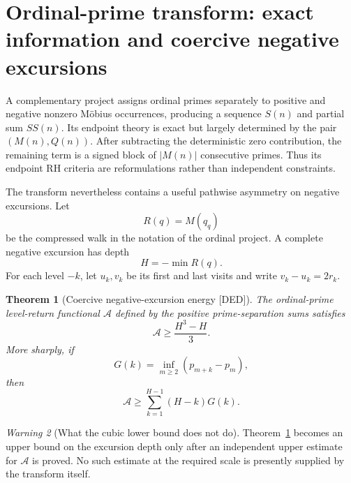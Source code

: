 \documentclass[11pt]{amsart}
\numberwithin{equation}{section}
\theoremstyle{plain}
\newtheorem{theorem}{Theorem}[section]
\theoremstyle{definition}
\theoremstyle{remark}
\newtheorem{warning}[theorem]{Warning}
\newcommand{\Mert}{M}
\newcommand{\Sq}{Q}
\newcommand{\DED}{\textup{[DED]}}
\begin{document}
\section{Ordinal-prime transform: exact information and coercive negative excursions}
\label{sec:ordinal-prime}

A complementary project assigns ordinal primes separately to positive and negative nonzero M\"obius occurrences, producing a
sequence $S(n)$ and partial sum $SS(n)$.  Its endpoint theory is exact but largely determined by the pair $(\Mert(n),\Sq(n))$.
After subtracting the deterministic zero contribution, the remaining term is a signed block of $|\Mert(n)|$ consecutive primes.
Thus its endpoint RH criteria are reformulations rather than independent constraints.

The transform nevertheless contains a useful pathwise asymmetry on negative excursions.  Let
\begin{equation}
R(q)=\Mert(q_q)
\label{eq:ordinal-squarefree-walk}
\end{equation}
be the compressed walk in the notation of the ordinal project.  A complete negative excursion has depth
\begin{equation}
H=-\min R(q).
\label{eq:negative-depth}
\end{equation}
For each level $-k$, let $u_k,v_k$ be its first and last visits and write $v_k-u_k=2r_k$.

\begin{theorem}[Coercive negative-excursion energy \DED]
\label{thm:ordinal-cubic-energy}
The ordinal-prime level-return functional $\mathcal A$ defined by the positive prime-separation sums satisfies
\begin{equation}
\mathcal A\ge\frac{H^3-H}{3}.
\label{eq:ordinal-cubic-energy}
\end{equation}
More sharply, if
\begin{equation}
G(k)=\inf_{m\ge2}(p_{m+k}-p_m),
\label{eq:prime-gap-block-min}
\end{equation}
then
\begin{equation}
\mathcal A\ge\sum_{k=1}^{H-1}(H-k)G(k).
\label{eq:ordinal-sharp-energy}
\end{equation}
\end{theorem}

\begin{warning}[What the cubic lower bound does not do]
\label{warn:ordinal-upper-missing}
Theorem~\ref{thm:ordinal-cubic-energy} becomes an upper bound on the excursion depth only after an independent upper estimate for
$\mathcal A$ is proved.  No such estimate at the required scale is presently supplied by the transform itself.
\end{warning}
\end{document}

